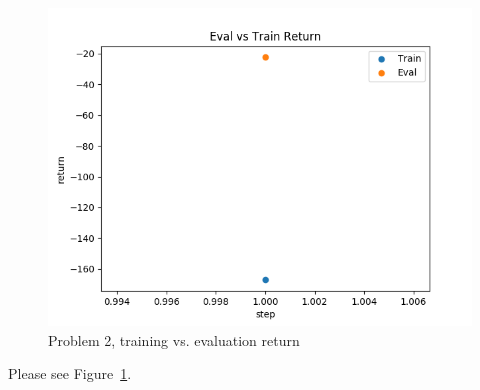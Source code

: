 \begin{figure}[htbp]
    \centering
    \includegraphics[width=0.5\linewidth]{figures/p2.png}
    \caption{Problem 2, training vs. evaluation return}
    \label{fig:p2}
\end{figure}

Please see Figure~\ref{fig:p2}. 
